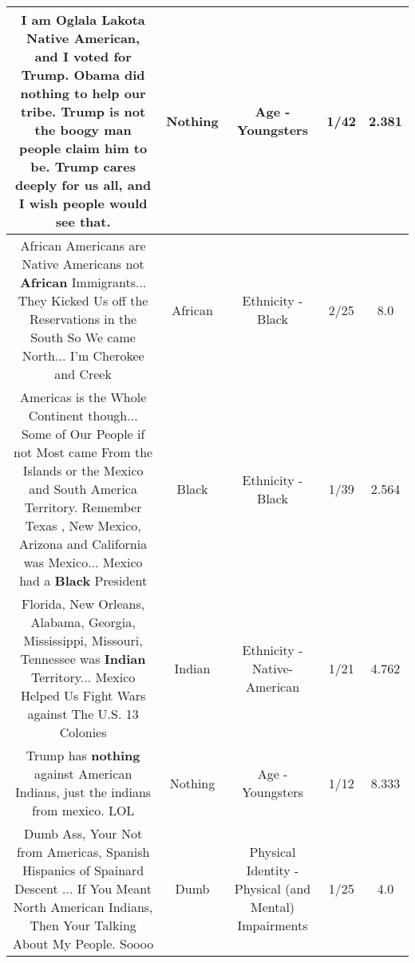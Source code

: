 \documentclass[11pt]{article}
\newlength\mylength
\begin{document}
\begin{center}
\begin{longtable}{|C{.65\mylength}|C{.30\mylength}|C{.12\mylength}|C{.12\mylength}|C{.12\mylength}|}
  \small I am Oglala Lakota Native American, and I voted for Trump. Obama did \textbf{nothing} to help our tribe. Trump is not the boogy man people claim him to be. Trump cares deeply for us all, and I wish people would see that.\normalsize   & Nothing & Age - Youngsters & 1/42 & 2.381 \\  \hline
  \small African Americans are Native Americans not \textbf{African} Immigrants... They Kicked Us off the Reservations in the South So We came North... I'm Cherokee and Creek\normalsize   & African & Ethnicity - Black & 2/25 & 8.0 \\  \hline
  \small Americas is the Whole Continent though... Some of Our People if not Most came From the Islands or the Mexico and South America Territory. Remember Texas , New Mexico, Arizona and California was Mexico... Mexico had a \textbf{Black} President\normalsize   & Black & Ethnicity - Black & 1/39 & 2.564 \\  \hline
  \small Florida, New Orleans, Alabama, Georgia, Mississippi, Missouri, Tennessee was \textbf{Indian} Territory... Mexico Helped Us Fight Wars against The U.S. 13 Colonies\normalsize   & Indian & Ethnicity - Native-American & 1/21 & 4.762 \\  \hline
  \small Trump has \textbf{nothing} against American Indians, just the indians from mexico. LOL\normalsize   & Nothing & Age - Youngsters & 1/12 & 8.333 \\  \hline
  \small Dumb Ass, Your Not from Americas, Spanish Hispanics of Spainard Descent ... If You Meant North American Indians, Then Your Talking About My People. Soooo\normalsize   & Dumb & Physical Identity - Physical (and Mental) Impairments & 1/25 & 4.0 \\  \hline

\end{longtable}
\end{center}
\end{document}
